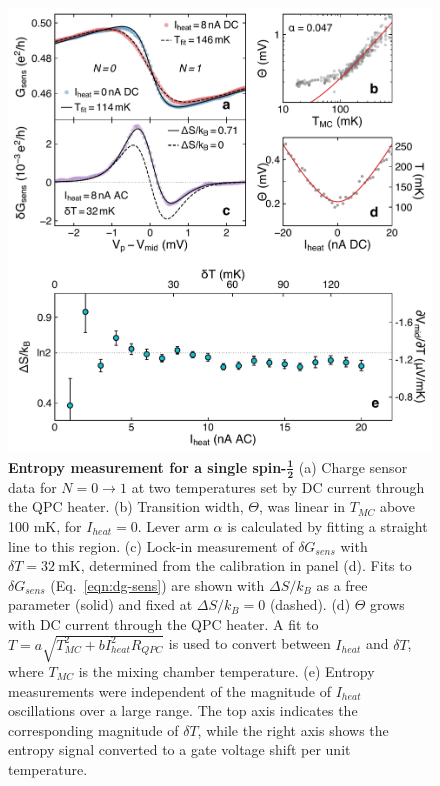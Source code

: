\documentclass[twocolumn,showpacs,amsmath,amssymb,prl,aps,superscriptaddress]{revtex4-1}
\begin{document}
\begin{figure}[!]
        \includegraphics[width=1.0\columnwidth]{../figures/figure_2.pdf}
        \caption{\label{fig:fig2} \textbf{Entropy measurement for a single spin-$\mathbf{\frac{1}{2}}$} (a) Charge sensor data for $N=0 \rightarrow 1$ at two temperatures set by DC current through the QPC heater. (b) Transition width, $\Theta$, was linear in $T_{MC}$ above 100 mK, for $I_{heat}=0$. Lever arm $\alpha$ is calculated by fitting a straight line to this region.  (c) Lock-in measurement of $\delta G_{sens}$ with $\delta T = \SI{32}{\milli\kelvin}$, determined from the calibration in panel (d). Fits to $\delta G_{sens}$ (Eq.~\ref{eqn:dg-sens}) are shown with $\Delta S / k_B$  as a free parameter (solid) and fixed at $\Delta S / k_B=0$ (dashed). (d) $\Theta$ grows with DC current through the QPC heater. A fit to $T = a\sqrt{T^{2}_{MC}+b I^2_{heat}R_{QPC}}$ is used to convert between $I_{heat}$ and $\delta T$, where $T_{MC}$ is the mixing chamber temperature\cite{Mittal1996}. (e)  Entropy measurements were independent of the magnitude of $I_{heat}$ oscillations over a large range. The top axis indicates the corresponding magnitude of $\delta T$, while the right axis shows the entropy signal converted to a gate voltage shift per unit temperature.}
\end{figure}
\end{document}

